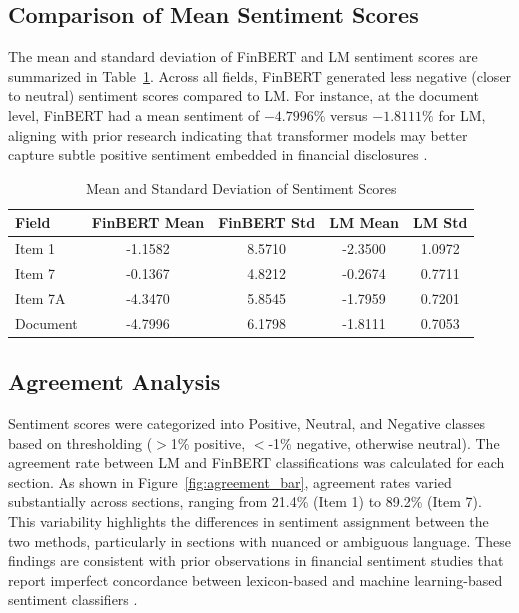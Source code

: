 \documentclass[12pt]{article}
\begin{document}
\subsection{Comparison of Mean Sentiment Scores}

The mean and standard deviation of FinBERT and LM sentiment scores are summarized in Table~\ref{tab:mean_std_results}. Across all fields, FinBERT generated less negative (closer to neutral) sentiment scores compared to LM. For instance, at the document level, FinBERT had a mean sentiment of $-4.7996\%$ versus $-1.8111\%$ for LM, aligning with prior research indicating that transformer models may better capture subtle positive sentiment embedded in financial disclosures \citep{Huang2020}.

\begin{table}[H]
\centering
\caption{Mean and Standard Deviation of Sentiment Scores}
\label{tab:mean_std_results}
\begin{tabular}{lcccc}
\hline
Field & FinBERT Mean & FinBERT Std & LM Mean & LM Std \\
\hline
Item 1 & -1.1582 & 8.5710 & -2.3500 & 1.0972 \\
Item 7 & -0.1367 & 4.8212 & -0.2674 & 0.7711 \\
Item 7A & -4.3470 & 5.8545 & -1.7959 & 0.7201 \\
Document & -4.7996 & 6.1798 & -1.8111 & 0.7053 \\
\hline
\end{tabular}
\end{table}

\subsection{Agreement Analysis}

Sentiment scores were categorized into Positive, Neutral, and Negative classes based on thresholding ($>$1\% positive, $<$-1\% negative, otherwise neutral). The agreement rate between LM and FinBERT classifications was calculated for each section. As shown in Figure~\ref{fig:agreement_bar}, agreement rates varied substantially across sections, ranging from 21.4\% (Item 1) to 89.2\% (Item 7). This variability highlights the differences in sentiment assignment between the two methods, particularly in sections with nuanced or ambiguous language. These findings are consistent with prior observations in financial sentiment studies that report imperfect concordance between lexicon-based and machine learning-based sentiment classifiers \citep{Li2010}.
\end{document}
